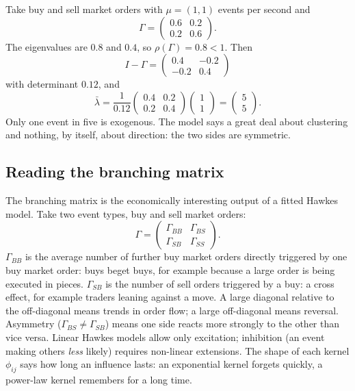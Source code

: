 \begin{example}
\label{ex:hawkes}
Take buy and sell market orders with $\mu = (1, 1)$ events per second and
\[
  \Gamma = \begin{pmatrix} 0.6 & 0.2 \\ 0.2 & 0.6 \end{pmatrix}.
\]
The eigenvalues are $0.8$ and $0.4$, so $\rho(\Gamma) = 0.8 < 1$. Then
\[
  I - \Gamma = \begin{pmatrix} 0.4 & -0.2 \\ -0.2 & 0.4 \end{pmatrix}
\]
with determinant $0.12$, and
\[
  \bar\lambda = \frac{1}{0.12}\begin{pmatrix} 0.4 & 0.2 \\ 0.2 & 0.4 \end{pmatrix}
  \begin{pmatrix} 1 \\ 1 \end{pmatrix} = \begin{pmatrix} 5 \\ 5 \end{pmatrix}.
\]
Only one event in five is exogenous. The model says a great deal about clustering and nothing, by
itself, about direction: the two sides are symmetric.
\end{example}

\subsection{Reading the branching matrix}
\label{sec:hawkes-read}

The branching matrix is the economically interesting output of a fitted Hawkes model. Take two
event types, buy and sell market orders:
\[
  \Gamma = \begin{pmatrix} \Gamma_{BB} & \Gamma_{BS} \\ \Gamma_{SB} & \Gamma_{SS} \end{pmatrix}.
\]
$\Gamma_{BB}$ is the average number of further buy market orders directly triggered by one buy
market order: buys beget buys, for example because a large order is being executed in pieces.
$\Gamma_{SB}$ is the number of sell orders triggered by a buy: a cross effect, for example traders
leaning against a move. A large diagonal relative to the off-diagonal means trends in order flow; a
large off-diagonal means reversal. Asymmetry ($\Gamma_{BS} \ne \Gamma_{SB}$) means one side reacts
more strongly to the other than vice versa. Linear Hawkes models allow only excitation; inhibition
(an event making others \emph{less} likely) requires non-linear extensions. The shape of each kernel
$\phi_{ij}$ says how long an influence lasts: an exponential kernel forgets quickly, a power-law
kernel remembers for a long time.

